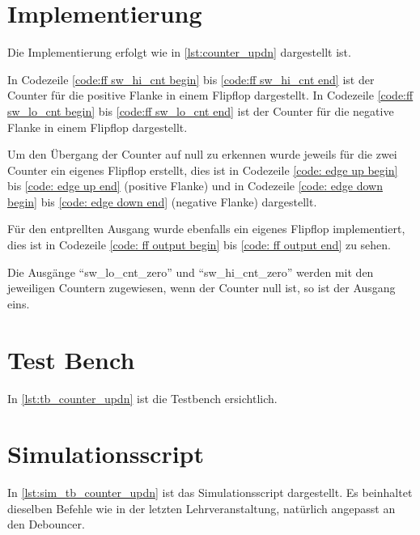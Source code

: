 \documentclass[./\jobname.tex]{subfiles}
\begin{document}
\section{Implementierung}
%
Die Implementierung erfolgt wie in \autoref{lst:counter_updn} dargestellt ist.\par
%
In Codezeile \autoref{code:ff sw_hi_cnt begin} bis \autoref{code:ff sw_hi_cnt end} ist der Counter für die positive Flanke in einem Flipflop dargestellt. In Codezeile \autoref{code:ff sw_lo_cnt begin} bis \autoref{code:ff sw_lo_cnt end} ist der Counter für die negative Flanke in einem Flipflop dargestellt.\par
%
Um den Übergang der Counter auf null zu erkennen wurde jeweils für die zwei Counter ein eigenes Flipflop erstellt, dies ist in Codezeile \autoref{code: edge up begin} bis \autoref{code: edge up end} (positive Flanke) und in Codezeile \autoref{code: edge down begin} bis \autoref{code: edge down end} (negative Flanke) dargestellt.\par
%
Für den entprellten Ausgang wurde ebenfalls ein eigenes Flipflop implementiert, dies ist in Codezeile \autoref{code: ff output begin} bis \autoref{code: ff output end} zu sehen.\par
%
Die Ausgänge \enquote{sw\_lo\_cnt\_zero} und \enquote{sw\_hi\_cnt\_zero} werden mit den jeweiligen Countern zugewiesen, wenn der Counter null ist, so ist der Ausgang eins.
%

%
\section{Test Bench}
%
In \autoref{lst:tb_counter_updn} ist die Testbench ersichtlich.
%

%
\section{Simulationsscript}
%
In \autoref{lst:sim_tb_counter_updn} ist das Simulationsscript dargestellt. Es beinhaltet dieselben Befehle wie in der letzten Lehrveranstaltung, natürlich angepasst an den Debouncer.
%

%
\end{document}
